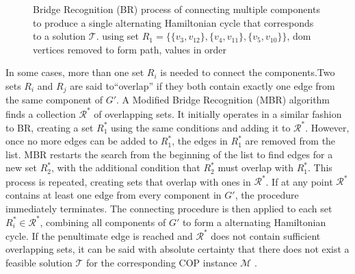 \documentclass{elsarticle}
\begin{document}
\begin{figure}[H]	
	\centering
	\begin{subfigure}[h]{0.28\textwidth}
		
		\caption{}
		\label{fig:mpsconnect}
	\end{subfigure} \hspace{5mm} %
	\begin{subfigure}[h]{0.28\textwidth}
		
		\caption{}
		\label{fig:mpscycle}
	\end{subfigure} \hspace{5mm}
	\begin{subfigure}[h]{0.28\textwidth}
		
		\caption{}
		\label{fig:mpspath}
	\end{subfigure}
	\caption{Bridge Recognition (BR) process of connecting multiple components to produce a single alternating Hamiltonian cycle that corresponds to a solution $\mathcal{T}$. \alert{using set $R_1 = \{\{v_3, v_{12}\}, \{v_4, v_{11}\}, \{v_5, v_{10}\}\}$, dom vertices removed to form path, values in order}}
	\label{fig:br}
\end{figure}

In some cases, more than one set $R_i$ is needed to connect the components.Two sets $R_i$ and $R_j$ are said to``overlap'' if they both contain exactly one edge from the same component of $G'$. A Modified Bridge Recognition (MBR) algorithm finds a collection $\mathcal{R}^*$ of overlapping sets. It initially operates in a similar fashion to BR, creating a set $R^{*}_1$ using the same conditions and adding it to $\mathcal{R}^*$. However, once no more edges can be added to $R^{*}_1$, the edges in $R^{*}_1$ are removed from the list. MBR restarts the search from the beginning of the list to find edges for a new set $R^{*}_2$, with the additional condition that $R^{*}_2$ must overlap with $R^{*}_1$. This process is repeated, creating sets that overlap with ones in $\mathcal{R}^*$. If at any point $\mathcal{R}^*$ contains at least one edge from every component in $G'$, the procedure immediately terminates. The connecting procedure is then applied to each set $R^{*}_i \in \mathcal{R}^*$, combining all components of $G'$ to form a alternating Hamiltonian cycle. If the penultimate edge is reached and $\mathcal{R}^*$ does not contain sufficient overlapping sets, it can be said with absolute certainty that there does not exist a feasible solution $\mathcal{T}$ for the corresponding COP instance $\mathcal{M}$ \cite{hawa2018}.
\end{document}
